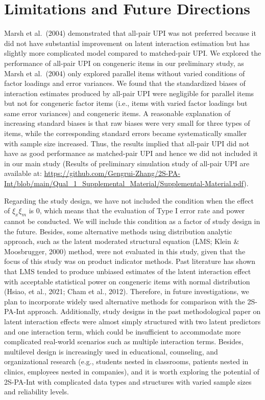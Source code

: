 \documentclass[
  man]{apa6}
\begin{document}
\section{Limitations and Future Directions}\label{limitations-and-future-directions}

Marsh et al.~(2004) demonstrated that all-pair UPI was not preferred because it did not have substantial improvement on latent interaction estimation but has slightly more complicated model compared to matched-pair UPI. We explored the performance of all-pair UPI on congeneric items in our preliminary study, as Marsh et al.~(2004) only explored parallel items without varied conditions of factor loadings and error variances. We found that the standardized biases of interaction estimates produced by all-pair UPI were negligible for parallel items but not for congeneric factor items (i.e., items with varied factor loadings but same error variances) and congeneric items. A reasonable explanation of increasing standard biases is that raw biases were very small for three types of items, while the corresponding standard errors became systematically smaller with sample size increased. Thus, the results implied that all-pair UPI did not have as good performance as matched-pair UPI and hence we did not included it in our main study (Results of preliminary simulation study of all-pair UPI are available at: \url{https://github.com/Gengrui-Zhang/2S-PA-Int/blob/main/Qual_1_Supplemental_Material/Supplemental-Material.pdf}).

Regarding the study design, we have not included the condition when the effect of \(\xi_{x}\xi_{m}\) is 0, which means that the evaluation of Type I error rate and power cannot be conducted. We will include this condition as a factor of study design in the future. Besides, some alternative methods using distribution analytic approach, such as the latent moderated structural equation (LMS; Klein \& Moosbrugger, 2000) method, were not evaluated in this study, given that the focus of this study was on product indicator methods. Past literature has shown that LMS tended to produce unbiased estimates of the latent interaction effect with acceptable statistical power on congeneric items with normal distribution (Hsiao, et al., 2021; Cham et al., 2012). Therefore, in future investigations, we plan to incorporate widely used alternative methods for comparison with the 2S-PA-Int approach. Additionally, study designs in the past methodological paper on latent interaction effects were almost simply structured with two latent predictors and one interaction term, which could be insufficient to accommodate more complicated real-world scenarios such as multiple interaction terms. Besides, multilevel design is increasingly used in educational, counseling, and organizational research (e.g., students nested in classrooms, patients nested in clinics, employees nested in companies), and it is worth exploring the potential of 2S-PA-Int with complicated data types and structures with varied sample sizes and reliability levels.
\end{document}
